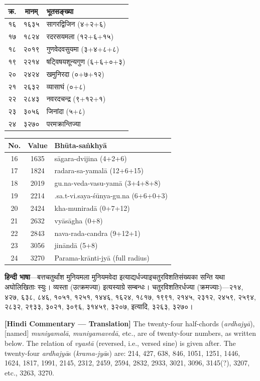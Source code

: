 \documentclass[11pt,a4paper]{book}
\newcommand{\dev}[1]{{\devanagarifont #1}}
\newcommand{\bilingual}[2]{%
  \par\vspace{0.6em}%
  \noindent\begin{minipage}[t]{0.48\textwidth}
    \RaggedRight
    #1%
  \end{minipage}%
  \hfill
  \begin{minipage}[t]{0.48\textwidth}
    \RaggedRight
    #2%
  \end{minipage}%
  \par\vspace{0.6em}%
}
\newcommand{\hindicommbilingual}[2]{%
  \par\vspace{0.5em}%
  \noindent\begin{minipage}[t]{0.48\textwidth}
    \RaggedRight\small
    \dev{#1}
  \end{minipage}%
  \hfill
  \begin{minipage}[t]{0.48\textwidth}
    \RaggedRight\small
    #2%
  \end{minipage}%
  \par\vspace{0.5em}%
}
\begin{document}
\bilingual{%
\begin{tabular}{|c|c|l|}
\hline
क्र. & मानम्‌ & भूतसङ्ख्या \\
\hline
१६ & १६३५ & सागरद्विजिन (४+२+६) \\
१७ & १८२४ & रदरसयमला (१२+६+१५) \\
१८ & २०१९ & गुणवेदवसुयमा (३+४+८+८) \\
१९ & २२१४ & षट्विषयशून्यगुण (६+६+०+३) \\
२० & २४२४ & खमुनिरदा (०+७+१२) \\
२१ & २६३२ & व्यासाघं (०+८) \\
२२ & २८४३ & नवरदचन्द्र (९+१२+१) \\
२३ & ३०५६ & जिनांदा (५+८) \\
२४ & ३२७० & परमक्रान्तिज्या \\
\hline
\end{tabular}
}{%
\begin{tabular}{|c|c|l|}
\hline
No. & Value & Bhūta-saṅkhyā \\
\hline
16 & 1635 & sāgara-dvijina (4+2+6) \\
17 & 1824 & radara-sa-yamalā (12+6+15) \\
18 & 2019 & gu.na-veda-vasu-yamā (3+4+8+8) \\
19 & 2214 & .sa.t-vi.saya-śūnya-gu.na (6+6+0+3) \\
20 & 2424 & kha-muniradā (0+7+12) \\
21 & 2632 & vyāsāgha (0+8) \\
22 & 2843 & nava-rada-candra (9+12+1) \\
23 & 3056 & jināndā (5+8) \\
24 & 3270 & Parama-krānti-jyā (full radius) \\
\hline
\end{tabular}
}

\vspace{0.5em}

\hindicommbilingual{%
\textbf{हिन्दी भाषा}---बत्तचतुर्थांश मुनियमला मुनियमवेदा इत्याद्यर्धज्याइचतुरविशतिसंख्यका सन्ति यथा अघोलिखिताः स्युः। व्यस्ता (उत्क्रमज्या) इत्यस्याग्रे सम्बन्धः। चतुरविशतिरर्धज्या (क्रमज्याः)---२१४, ४२७, ६३८, ८४६, १०५१, १२५१, १४४६, १६२४, १८१७, १९९१, २१४५, २३१२, २४५९, २५९४, २८३२, २९३३, ३०२१, ३०९६, ३१४५९, ३२०७, इत्यादि, ३२६३, ३२७०।
}{%
\textbf{[Hindi Commentary --- Translation]} The twenty-four half-chords (\textit{ardhajyā}), [named] \textit{muniyamalā}, \textit{muniyamavedā}, etc., are of twenty-four numbers, as written below. The relation of \textit{vyastā} (reversed, i.e., versed sine) is given after. The twenty-four \textit{ardhajyā}s (\textit{krama-jyā}s) are: 214, 427, 638, 846, 1051, 1251, 1446, 1624, 1817, 1991, 2145, 2312, 2459, 2594, 2832, 2933, 3021, 3096, 3145(?), 3207, etc., 3263, 3270.
}
\end{document}
